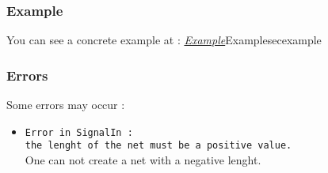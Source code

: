 \begin{htmlonly}

\subsubsection{Example}

You can see a concrete example at : \hyperref[ref]{\emph{Example}}{}{Example}{secexample}

\end{htmlonly}
    
\subsubsection{Errors}
    
Some errors may occur :
\begin{itemize}
    \item \verb-Error in SignalIn :-\\\verb-the lenght of the net must be a positive value.-\\One can not create a net with a negative lenght.
\end{itemize}

\begin{htmlonly}

\end{htmlonly}
